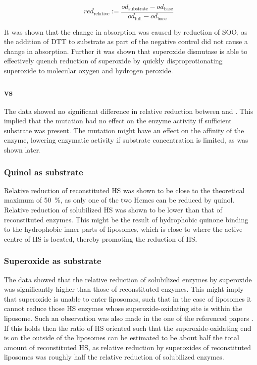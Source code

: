 \begin{equation}
	red_{\text{relative}} := \frac{od_{\text{substrate}} -
	od_{\text{base}}}{od_{\text{full}} - od_{\text{base}}}
	\label{eq:relative_reduction}
\end{equation}

It was shown that the change in absorption was caused by reduction of SOO, as
the addition of DTT to substrate as part of the negative control did not cause
a change in absorption. Further it was shown that superoxide dismutase is able
to effectively quench reduction of superoxide by quickly disproprotionating
superoxide to molecular oxygen and hydrogen peroxide.


\subsubsection{\hs{} vs \hsmut{}}

The data showed no significant difference in relative reduction between \hs{}
and \hsmut{}. This implied that the mutation had no effect on the enzyme
activity if sufficient substrate was present. The mutation might have an effect
on the affinity of the enzyme, lowering enzymatic activity if substrate
concentration is limited, as was shown later.

\subsubsection{Quinol as substrate}

Relative reduction of reconstituted HS was shown to be close to the theoretical
maximum of \SI{50}{\percent}, as only one of the two Hemes can be reduced by
quinol. Relative reduction of solubilized HS was shown to be lower than that of
reconstituted enzymes. This might be the result of hydrophobic quinone binding
to the hydrophobic inner parts of liposomes, which is close to where the active
centre of HS is located, thereby promoting the reduction of
HS.\cite{superoxide_salvaging}

\subsubsection{Superoxide as substrate}

The data showed that the relative reduction of solubilized enzymes by
superoxide was significantly higher than those of reconstituted enzymes. This
might imply that superoxide is unable to enter liposomes, such that in the case
of liposomes it cannot reduce those HS enzymes whose superoxide-oxidating site
is within the liposome. Such an observation was also made in the one of the
referenced papers \cite{superoxide_salvaging}. If this holds then the ratio of
HS oriented such that the superoxide-oxidating end is on the outside of the
liposomes can be estimated to be about half the total amount of reconstituted
HS, as relative reduction by superoxides of reconstituted liposomes was roughly
half the relative reduction of solubilized enzymes.


